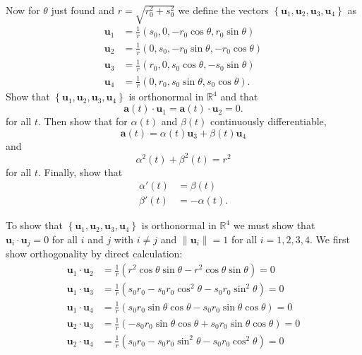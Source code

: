 \documentclass{exam}
\newcommand{\RR}{\mathbb R}
\newcommand{\braces}[1]{\ensuremath{\left\{#1 \right\}}}
\begin{document}
\begin{questions}
    Now for $\theta$ just found and $r = \sqrt{r_0^2 + s_0^2}$ we define the vectors $\braces{\mathbf{u}_1, \mathbf{u}_2, \mathbf{u}_3, \mathbf{u}_4}$ as 
    \begin{align*}
        \mathbf{u}_1 &= \frac{1}{r}(s_0, 0, -r_0 \cos \theta, r_0 \sin \theta) \\
        \mathbf{u}_2 &= \frac{1}{r}(0, s_0, -r_0 \sin \theta, -r_0 \cos\theta) \\
        \mathbf{u}_3 &= \frac{1}{r}(r_0, 0, s_0 \cos \theta, -s_0 \sin \theta) \\
        \mathbf{u}_4 &= \frac{1}{r}(0, r_0, s_0 \sin \theta, s_0 \cos \theta).
    \end{align*}
    \question Show that $\braces{\mathbf{u}_1, \mathbf{u}_2, \mathbf{u}_3, \mathbf{u}_4}$ is orthonormal in $\RR^{4}$ and that 
    \[
        \mathbf{a}(t) \cdot \mathbf{u}_1 = \mathbf{a}(t) \cdot \mathbf{u}_2 = 0. 
    \]
    for all $t$. Then show that for $\alpha(t)$ and $\beta(t)$ continuously differentiable, 
    \[
        \mathbf{a}(t) = \alpha(t)\mathbf{u}_3 + \beta(t)\mathbf{u}_4 
    \]
    and 
    \[
        \alpha^2(t) + \beta^2(t) = r^2 
    \]
    for all $t$. Finally, show that 
    \begin{align*}
        \alpha'(t) &= \beta(t) \\
        \beta'(t) &= -\alpha(t).
    \end{align*}
    \begin{solution}
        To show that $\braces{\mathbf{u}_1, \mathbf{u}_2, \mathbf{u}_3, \mathbf{u}_4}$ is orthonormal in $\RR^4$ we must show that $\mathbf{u}_i \cdot \mathbf{u}_j = 0$ for all $i$ and $j$ with $i \neq j$ and $\|\mathbf{u}_i\| = 1$ for all $i = 1, 2, 3, 4$. We first show orthogonality by direct calculation: 
        \begin{align*}
            \mathbf{u}_1 \cdot \mathbf{u}_2 &= \frac{1}{r}(r^2 \cos \theta \sin \theta - r^2 \cos \theta \sin \theta) = 0 \\
            \mathbf{u}_1 \cdot \mathbf{u}_3 &= \frac{1}{r}(s_0 r_0 - s_0 r_0 \cos^2 \theta - s_0 r_0 \sin^2 \theta) = 0 \\
            \mathbf{u}_1 \cdot \mathbf{u}_4 &= \frac{1}{r}(s_0 r_0 \sin \theta \cos \theta - s_0 r_0 \sin \theta \cos \theta) = 0 \\
            \mathbf{u}_2 \cdot \mathbf{u}_3 &= \frac{1}{r}(-s_0 r_0 \sin \theta \cos \theta + s_0 r_0 \sin \theta \cos \theta) = 0 \\
            \mathbf{u}_2 \cdot \mathbf{u}_4 &= \frac{1}{r}(s_0 r_0 - s_0 r_0 \sin^2 \theta - s_0 r_0 \cos^2 \theta) = 0 \\

\end{align*}
\end{solution}
\end{questions}
\end{document}
